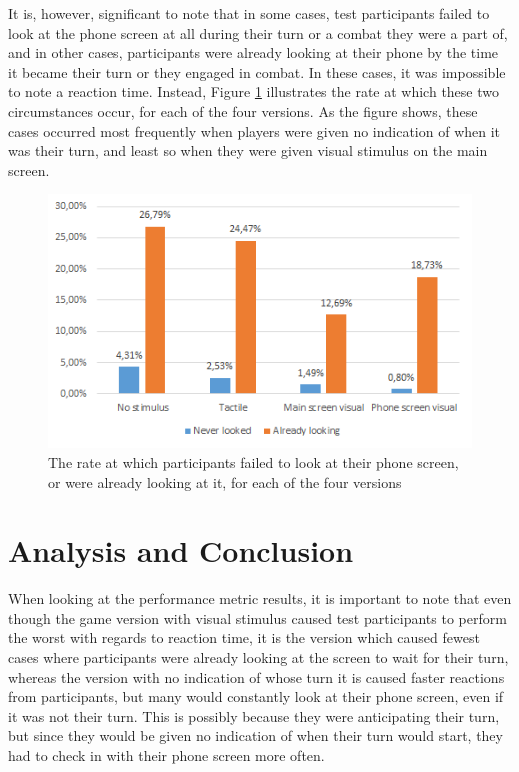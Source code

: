 It is, however, significant to note that in some cases, test participants failed to look at the phone screen at all during their turn or a combat they were a part of, and in other cases, participants were already looking at their phone by the time it became their turn or they engaged in combat. In these cases, it was impossible to note a reaction time. Instead, Figure \ref{fig:looked} illustrates the rate at which these two circumstances occur, for each of the four versions. As the figure shows, these cases occurred most frequently when players were given no indication of when it was their turn, and least so when they were given visual stimulus on the main screen. 

\begin{figure}[h!]
	\centering
	\includegraphics[scale=1]{figures/graph_looked.png}
	\caption{The rate at which participants failed to look at their phone screen, or were already looking at it, for each of the four versions}\label{fig:looked}
\end{figure}

\section{Analysis and Conclusion}
When looking at the performance metric results, it is important to note that even though the game version with visual stimulus caused test participants to perform the worst with regards to reaction time, it is the version which caused fewest cases where participants were already looking at the screen to wait for their turn, whereas the version with no indication of whose turn it is caused faster reactions from participants, but many would constantly look at their phone screen, even if it was not their turn. This is possibly because they were anticipating their turn, but since they would be given no indication of when their turn would start, they had to check in with their phone screen more often. 